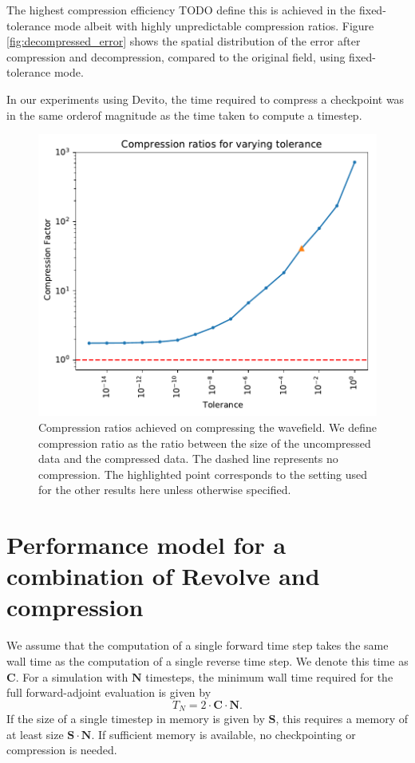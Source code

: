 \documentclass[conference]{IEEEtran}
\begin{document}
The highest compression efficiency TODO define this is achieved in the
fixed-tolerance mode albeit with highly unpredictable compression ratios. Figure
\ref{fig:decompressed_error} shows the spatial distribution of the error after
compression and decompression, compared to the original field, using
fixed-tolerance mode.

In our experiments using Devito, the time required to compress a checkpoint was
in the same orderof magnitude as the time taken to compute a timestep.

\begin{figure}
\begin{center}
\includegraphics[width=0.8\linewidth]{images/tolerance-cf-richter.pdf}
\end{center}
\caption{Compression ratios achieved on compressing the wavefield. We
  define compression ratio as the ratio between the size of the
  uncompressed data and the compressed data. The dashed line
  represents no compression. The highlighted point corresponds to the
  setting used for the other results here unless otherwise specified.}
\label{fig:tolerance_cf_plot}
\end{figure}

\section{Performance model for a combination of Revolve and compression}
\label{sec:performance_model}
We assume that the computation of a single forward time step takes the same wall
time as the computation of a single reverse time step. We denote this time as
$\mathbf{C}$. For a simulation with $\mathbf{N}$ timesteps, the minimum wall time required
for the full forward-adjoint evaluation is given by
\begin{equation}
T_N = 2 \cdot \mathbf{C} \cdot \mathbf{N}.
\end{equation}
If the size of a single timestep in memory is given by $\mathbf{S}$, this
requires a memory of at least size $\mathbf{S} \cdot \mathbf{N}$. If sufficient memory
is available, no checkpointing or compression is needed.
\end{document}
